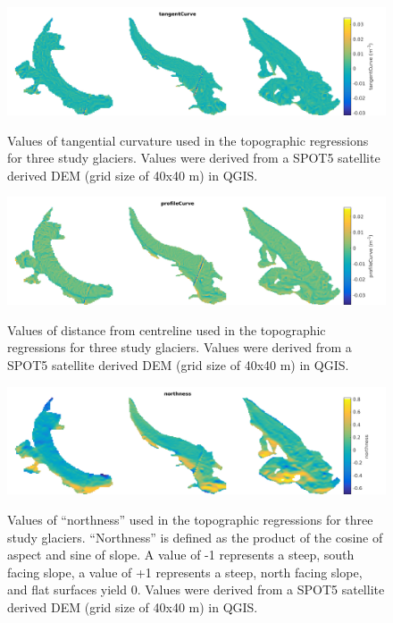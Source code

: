 \documentclass[12pt]{article}
\begin{document}
\begin{landscape}
\begin{figure}
	\centering
	\includegraphics[height = 0.4\textwidth]{Map_tangentCurve.png}\\
	\caption{Values of tangential curvature used in the topographic regressions for three study glaciers. Values were derived from a SPOT5 satellite derived DEM (grid size of 40x40 m) in QGIS.}
	\label{map:tangentC}
\end{figure}

\begin{figure}
	\centering
	\includegraphics[height = 0.36\textwidth]{Map_profileCurve.png}\\
	\caption{Values of distance from centreline used in the topographic regressions for three study glaciers. Values were derived from a SPOT5 satellite derived DEM (grid size of 40x40 m) in QGIS.}
	\label{map:profileC}
\end{figure}

\begin{figure}
	\centering
	\includegraphics[height = 0.36\textwidth]{Map_northness.png}\\
	\caption{Values of ``northness'' used in the topographic regressions for three study glaciers. ``Northness'' is defined as the product of the cosine of aspect and sine of slope. A value of -1 represents a steep, south facing slope, a value of +1 represents a steep, north facing slope, and flat surfaces yield 0. Values were derived from a SPOT5 satellite derived DEM (grid size of 40x40 m) in QGIS.}
	\label{map:northness}
\end{figure}


\end{landscape}
\end{document}

